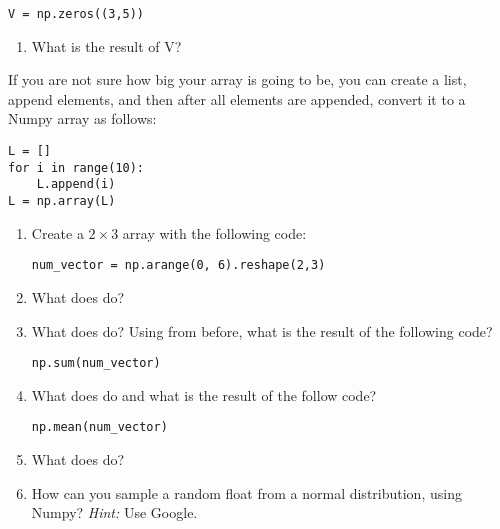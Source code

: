 \documentclass{article}
\begin{document}
\begin{lstlisting}
V = np.zeros((3,5))
\end{lstlisting}

\begin{enumerate}[resume]
    \item What is the result of V?
\end{enumerate}

If you are not sure how big your array is going to be, you can create a list, append elements,
and then after all elements are appended, convert it to a Numpy array as follows:

\begin{lstlisting}
L = []
for i in range(10):
    L.append(i)
L = np.array(L)
\end{lstlisting}

%
%
%

\begin{enumerate}[resume]
   \item Create a $2\times 3$ array with the following code:

\begin{lstlisting}
num_vector = np.arange(0, 6).reshape(2,3)
\end{lstlisting}

   \item What does  do?

   \item What does  do? Using  from before, what is the result of the following code?

\begin{lstlisting}
np.sum(num_vector)
\end{lstlisting}


   \item What does  do and what is the result of the follow code?

\begin{lstlisting}
np.mean(num_vector)
\end{lstlisting}

   \item What does  do?

   \item How can you sample a random float from a normal distribution, using Numpy? \newline
       {\em Hint:} Use Google.

\end{enumerate}
\end{document}
